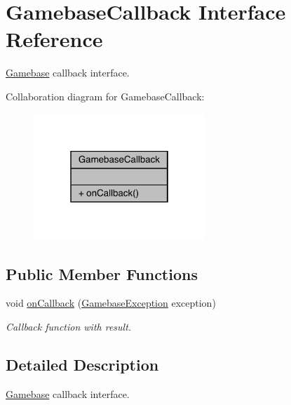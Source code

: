 \hypertarget{interfacecom_1_1toast_1_1android_1_1gamebase_1_1_gamebase_callback}{}\section{Gamebase\+Callback Interface Reference}
\label{interfacecom_1_1toast_1_1android_1_1gamebase_1_1_gamebase_callback}


\hyperlink{classcom_1_1toast_1_1android_1_1gamebase_1_1_gamebase}{Gamebase} callback interface.  




Collaboration diagram for Gamebase\+Callback\+:\nopagebreak
\begin{figure}[H]
\begin{center}
\leavevmode
\includegraphics[width=183pt]{interfacecom_1_1toast_1_1android_1_1gamebase_1_1_gamebase_callback__coll__graph}
\end{center}
\end{figure}
\subsection*{Public Member Functions}
\begin{DoxyCompactItemize}
\item 
void \hyperlink{interfacecom_1_1toast_1_1android_1_1gamebase_1_1_gamebase_callback_a810f2920c5b907c7667a4f097b7c6dca}{on\+Callback} (\hyperlink{classcom_1_1toast_1_1android_1_1gamebase_1_1base_1_1_gamebase_exception}{Gamebase\+Exception} exception)
\begin{DoxyCompactList}\small\item\em Callback function with result. \end{DoxyCompactList}\end{DoxyCompactItemize}


\subsection{Detailed Description}
\hyperlink{classcom_1_1toast_1_1android_1_1gamebase_1_1_gamebase}{Gamebase} callback interface. 

